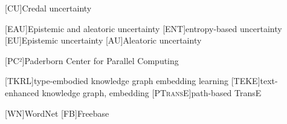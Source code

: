 \begin{acronym}[ECU]
[CU]{Credal uncertainty}

[EAU]{Epistemic and aleatoric uncertainty}
[ENT]{entropy-based uncertainty}
[EU]{Epistemic uncertainty}
[AU]{Aleatoric uncertainty}
    
[PC²]{Paderborn Center for Parallel Computing}

[\textsc{TKRL}]{type-embodied knowledge graph embedding learning}
[\textsc{TEKE}]{text-enhanced knowledge graph, embedding}
[\textsc{PTransE}]{path-based TransE}



[\textsc{WN}]{WordNet}
[\textsc{FB}]{Freebase}


\end{acronym}